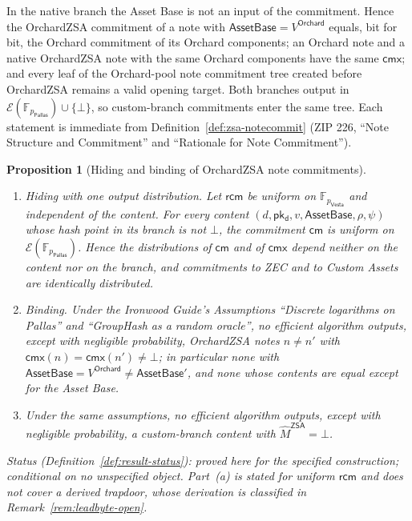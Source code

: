 \documentclass[11pt,a4paper]{article}
\newtheorem{proposition}[theorem]{Proposition}
\theoremstyle{definition}
\newcommand{\F}{\mathbb{F}}
\newcommand{\cmsym}{\mathsf{cm}}
\newcommand{\cmx}{\mathsf{cmx}}
\newcommand{\Pallas}{\ensuremath{\mathsf{Pallas}}}
\newcommand{\Vesta}{\ensuremath{\mathsf{Vesta}}}
\newcommand{\Ep}{\ensuremath{\mathcal{E}}}
\newcommand{\pkd}{\ensuremath{\mathsf{pk_d}}}
\newcommand{\rcm}{\ensuremath{\mathsf{rcm}}}
\begin{document}
In the native branch the Asset Base is not an input of the commitment.
Hence the OrchardZSA commitment of a note with
$\mathsf{AssetBase} = V^{\mathsf{Orchard}}$ equals, bit for bit, the Orchard
commitment of its Orchard components; an Orchard note and a native
OrchardZSA note with the same Orchard components have the same $\cmx$; and
every leaf of the Orchard-pool note commitment tree created before
OrchardZSA remains a valid opening target. Both branches output in
$\Ep(\F_{p_{\Pallas}}) \cup \{\bot\}$, so custom-branch commitments enter
the same tree. Each statement is immediate from
Definition~\ref{def:zsa-notecommit} (ZIP 226, ``Note Structure and
Commitment'' and ``Rationale for Note Commitment'').

\begin{proposition}[Hiding and binding of OrchardZSA note commitments]
\label{prop:zsa-cm}
\leavevmode
\begin{enumerate}
\item[(a)] Hiding with one output distribution. Let $\rcm$ be uniform on
  $\F_{p_{\Vesta}}$ and independent of the content. For every content
  $(d, \pkd, v, \mathsf{AssetBase}, \rho, \psi)$ whose hash point in its
  branch is not $\bot$, the commitment $\cmsym$ is uniform on
  $\Ep(\F_{p_{\Pallas}})$. Hence the distributions of $\cmsym$ and of
  $\cmx$ depend neither on the content nor on the branch, and commitments
  to ZEC and to Custom Assets are identically distributed.
\item[(b)] Binding. Under the \emph{Ironwood Guide}'s Assumptions
  ``Discrete logarithms on Pallas'' and ``GroupHash as a random oracle'',
  no efficient algorithm outputs, except with negligible probability,
  OrchardZSA notes $n \neq n'$ with $\cmx(n) = \cmx(n') \neq \bot$; in
  particular none with
  $\mathsf{AssetBase} = V^{\mathsf{Orchard}} \neq \mathsf{AssetBase}'$,
  and none whose contents are equal except for the Asset Base.
\item[(c)] Under the same assumptions, no efficient algorithm outputs,
  except with negligible probability, a custom-branch content with
  $\hat{M}^{\mathsf{ZSA}} = \bot$.
\end{enumerate}
Status (Definition~\ref{def:result-status}): proved here for the specified
construction; conditional on no unspecified object. Part~(a) is stated for
uniform $\rcm$ and does not cover a derived trapdoor, whose derivation is
classified in Remark~\ref{rem:leadbyte-open}.
\end{proposition}
\end{document}

